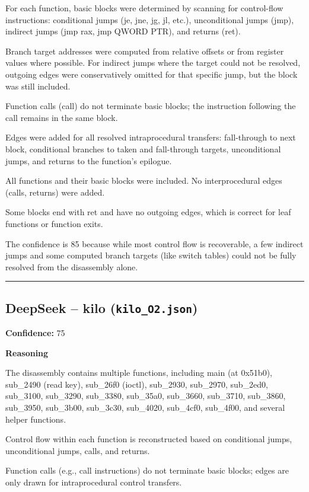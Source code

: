 For each function, basic blocks were determined by scanning for control-flow instructions: conditional jumps (je, jne, jg, jl, etc.), unconditional jumps (jmp), indirect jumps (jmp rax, jmp QWORD PTR), and returns (ret).

Branch target addresses were computed from relative offsets or from register values where possible. For indirect jumps where the target could not be resolved, outgoing edges were conservatively omitted for that specific jump, but the block was still included.

Function calls (call) do not terminate basic blocks; the instruction following the call remains in the same block.

Edges were added for all resolved intraprocedural transfers: fall-through to next block, conditional branches to taken and fall-through targets, unconditional jumps, and returns to the function's epilogue.

All functions and their basic blocks were included. No interprocedural edges (calls, returns) were added.

Some blocks end with ret and have no outgoing edges, which is correct for leaf functions or function exits.

The confidence is 85 because while most control flow is recoverable, a few indirect jumps and some computed branch targets (like switch tables) could not be fully resolved from the disassembly alone.

\bigskip
\hrule
\bigskip

\subsection{DeepSeek -- kilo (\texttt{kilo\_O2.json})}

\textbf{Confidence:} 75

\textbf{Reasoning}

The disassembly contains multiple functions, including main (at 0x51b0), sub\_2490 (read key), sub\_26f0 (ioctl), sub\_2930, sub\_2970, sub\_2ed0, sub\_3100, sub\_3290, sub\_3380, sub\_35a0, sub\_3660, sub\_3710, sub\_3860, sub\_3950, sub\_3b00, sub\_3c30, sub\_4020, sub\_4cf0, sub\_4f00, and several helper functions.

Control flow within each function is reconstructed based on conditional jumps, unconditional jumps, calls, and returns.

Function calls (e.g., call instructions) do not terminate basic blocks; edges are only drawn for intraprocedural control transfers.

